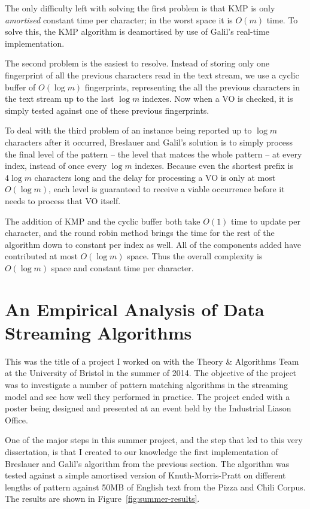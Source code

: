 \documentclass[ %
                    author={Dominic Joseph Moylett},
                    degree={MEng},
                     title={Dictionary Matching with Fingerprints},
                  subtitle={An Empirical Analysis},
                      type={research},
                      year={2015} ]{dissertation}
\begin{document}
The only difficulty left with solving the first problem is that KMP is only \textit{amortised} constant time per character; in the worst space it is $O(m)$ time. To solve this, the KMP algorithm is deamortised by use of Galil's \cite{Galil:1981:SMR:322234.322244} real-time implementation.

The second problem is the easiest to resolve. Instead of storing only one fingerprint of all the previous characters read in the text stream, we use a cyclic buffer of $O(\log m)$ fingerprints, representing the all the previous characters in the text stream up to the last $\log m$ indexes. Now when a VO is checked, it is simply tested against one of these previous fingerprints.

To deal with the third problem of an instance being reported up to $\log m$ characters after it occurred, Breslauer and Galil's solution is to simply process the final level of the pattern  --  the level that matces the whole pattern  --  at every index, instead of once every $\log m$ indexes. Because even the shortest prefix is $4\log m$ characters long and the delay for processing a VO is only at most $O(\log m)$, each level is guaranteed to receive a viable occurrence before it needs to process that VO itself.

The addition of KMP and the cyclic buffer both take $O(1)$ time to update per character, and the round robin method brings the time for the rest of the algorithm down to constant per index as well. All of the components added have contributed at most $O(\log m)$ space. Thus the overall complexity is $O(\log m)$ space and constant time per character.

\section{An Empirical Analysis of Data Streaming Algorithms}
\label{sec:summer}

This was the title of a project I worked on with the Theory \& Algorithms Team at the University of Bristol in the summer of 2014. The objective of the project was to investigate a number of pattern matching algorithms in the streaming model and see how well they performed in practice. The project ended with a poster being designed and presented at an event held by the Industrial Liason Office.

One of the major steps in this summer project, and the step that led to this very dissertation, is that I created to our knowledge the first implementation of Breslauer and Galil's algorithm from the previous section. The algorithm was tested against a simple amortised version of Knuth-Morris-Pratt on different lengths of pattern against 50MB of English text from the Pizza and Chili Corpus. The results are shown in Figure~\ref{fig:summer-results}.
\end{document}
